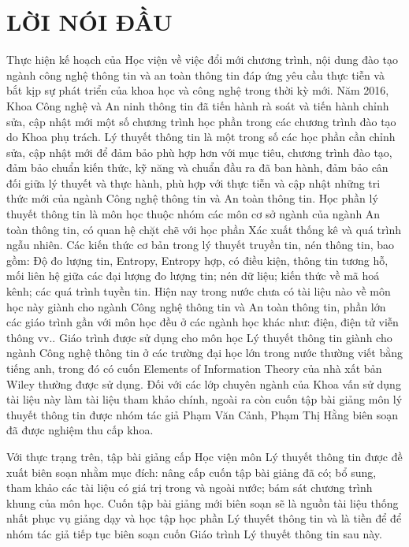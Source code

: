 \chapter*{LỜI NÓI ĐẦU}
Thực hiện kế hoạch của Học viện về việc đổi mới chương trình, nội dung đào tạo ngành công nghệ thông tin và an toàn thông tin đáp ứng yêu cầu thực tiễn và bắt kịp sự phát triển của khoa học và công nghệ trong thời kỳ mới. Năm 2016, Khoa Công nghệ và An ninh thông tin đã tiến hành rà soát và tiến hành chỉnh sửa, cập nhật mới một số chương trình học phần trong các chương trình đào tạo do Khoa phụ trách. Lý thuyết thông tin là một trong số các học phần cần chỉnh sửa, cập nhật mới để đảm bảo phù hợp hơn với mục tiêu, chương trình đào tạo, đảm bảo chuẩn kiến thức, kỹ năng và chuẩn đầu ra đã ban hành, đảm bảo cân đối giữa lý thuyết và thực hành, phù hợp với thực tiễn và cập nhật những tri thức mới của ngành Công nghệ thông tin và An toàn thông tin. 
Học phần lý thuyết thông tin là môn học thuộc nhóm các môn cơ sở ngành của ngành An toàn thông tin, có quan hệ chặt chẽ với học phần Xác xuất thống kê và quá trình ngẫu nhiên. Các kiến thức cơ bản trong lý thuyết truyền tin, nén thông tin, bao gồm: Độ đo lượng tin, Entropy, Entropy hợp, có điều kiện, thông tin tương hỗ, mối liên hệ giữa các đại lượng đo lượng tin; nén dữ liệu; kiến thức về mã hoá kênh; các quá trình tuyền tin. 
Hiện nay trong nước chưa có tài liệu nào về môn học này giành cho ngành Công nghệ thông tin và An toàn thông tin, phần lớn các giáo trình gần với môn học đều ở các ngành học khác như: điện, điện tử viễn thông vv.. 
Giáo trình được sử dụng cho môn học Lý thuyết thông tin giành cho ngành Công nghệ thông tin ở các trường đại học lớn trong nước thường viết bằng tiếng anh, trong đó có cuốn Elements of Information Theory của nhà xất bản Wiley thường được sử dụng. Đối với các lớp chuyên ngành của Khoa vấn sử dụng tài liệu này làm tài liệu tham khảo chính, ngoài ra còn cuốn tập bài giảng môn lý thuyết thông tin được nhóm tác giả Phạm Văn Cảnh, Phạm Thị Hằng biên soạn đã được nghiệm thu cấp khoa. 

Với thực trạng trên, tập bài giảng cấp Học viện môn Lý thuyết thông tin được đề xuất biên soạn nhằm mục đích: nâng cấp cuốn tập bài giảng đã có; bổ sung, tham khảo các tài liệu có giá trị trong và ngoài nước; bám sát chương trình khung của môn học. Cuốn tập bài giảng mới biên soạn sẽ là nguồn tài liệu thống nhất phục vụ giảng dạy và học tập học phần Lý thuyết thông tin và là tiền để để nhóm tác giả tiếp tục biên soạn cuốn Giáo trình Lý thuyết thông tin sau này.
